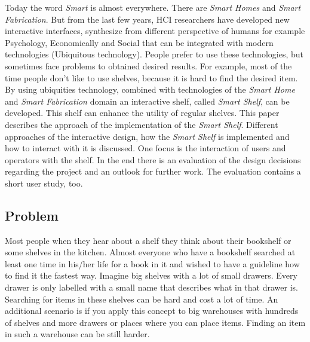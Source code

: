 Today the word \textit{Smart} is almost everywhere. There are \textit{Smart Homes} and \textit{Smart Fabrication}. 
But from the last few years, HCI researchers have developed new interactive interfaces, synthesize from different perspective of humans for example Psychology, Economically and Social that can be integrated with modern technologies (Ubiquitous technology). 
People prefer to use these technologies, but sometimes face problems to obtained desired results. 
For example, most of the time people don't like to use shelves, because it is hard to find the desired item. 
By using ubiquities technology, combined with technologies of the \textit{Smart Home} and \textit{Smart Fabrication} domain an interactive shelf, called \textit{Smart Shelf}, can be developed. 
This shelf can enhance the utility of regular shelves. 
This paper describes the approach of the implementation of the \textit{Smart Shelf}. 
Different approaches of the interactive design, how the \textit{Smart Shelf} is implemented and how to interact with it is discussed. 
One focus is the interaction of users and operators with the shelf. 
In the end there is an evaluation of the design decisions regarding the project and an outlook for further work. 
The evaluation contains a short user study, too. 

\subsection{Problem}
Most people when they hear about a shelf they think about their bookshelf or some shelves in the kitchen. 
Almost everyone who have a bookshelf searched at least one time in his/her life for a book in it and wished to have a guideline how to find it the fastest way. 
Imagine big shelves with a lot of small drawers. 
Every drawer is only labelled with a small name that describes what in that drawer is. 
Searching for items in these shelves can be hard and cost a lot of time. 
An additional scenario is if you apply this concept to big warehouses with hundreds of shelves and more drawers or places where you can place items. 
Finding an item in such a warehouse can be still harder. 

